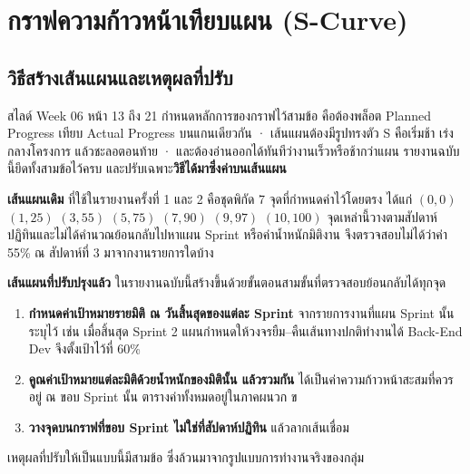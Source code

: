 \clearpage
\section{กราฟความก้าวหน้าเทียบแผน (S-Curve)}
\label{sec:scurve}

\subsection{วิธีสร้างเส้นแผนและเหตุผลที่ปรับ}
\label{sec:curvemethod}

สไลด์ Week 06 หน้า 13 ถึง 21 กำหนดหลักการของกราฟไว้สามข้อ คือต้องพล็อต Planned Progress เทียบ Actual Progress บนแกนเดียวกัน · เส้นแผนต้องมีรูปทรงตัว S คือเริ่มช้า เร่งกลางโครงการ แล้วชะลอตอนท้าย · และต้องอ่านออกได้ทันทีว่างานเร็วหรือช้ากว่าแผน รายงานฉบับนี้ยึดทั้งสามข้อไว้ครบ และปรับเฉพาะ\textbf{วิธีได้มาซึ่งค่าบนเส้นแผน}

\vspace{0.5em}
\noindent\textbf{เส้นแผนเดิม} ที่ใช้ในรายงานครั้งที่ 1 และ 2 คือชุดพิกัด 7 จุดที่กำหนดค่าไว้โดยตรง ได้แก่ $(0,0)$ $(1,25)$ $(3,55)$ $(5,75)$ $(7,90)$ $(9,97)$ $(10,100)$ จุดเหล่านี้วางตามสัปดาห์ปฏิทินและไม่ได้คำนวณย้อนกลับไปหาแผน Sprint หรือค่าน้ำหนักมิติงาน จึงตรวจสอบไม่ได้ว่าค่า 55\% ณ สัปดาห์ที่ 3 มาจากงานรายการใดบ้าง

\vspace{0.5em}
\noindent\textbf{เส้นแผนที่ปรับปรุงแล้ว} ในรายงานฉบับนี้สร้างขึ้นด้วยขั้นตอนสามขั้นที่ตรวจสอบย้อนกลับได้ทุกจุด

\begin{enumerate}
  \item \textbf{กำหนดค่าเป้าหมายรายมิติ ณ วันสิ้นสุดของแต่ละ Sprint} จากรายการงานที่แผน Sprint นั้นระบุไว้ เช่น เมื่อสิ้นสุด Sprint 2 แผนกำหนดให้วงจรยืม–คืนเส้นทางปกติทำงานได้ Back-End Dev จึงตั้งเป้าไว้ที่ 60\%
  \item \textbf{คูณค่าเป้าหมายแต่ละมิติด้วยน้ำหนักของมิตินั้น แล้วรวมกัน} ได้เป็นค่าความก้าวหน้าสะสมที่ควรอยู่ ณ ขอบ Sprint นั้น ตารางค่าทั้งหมดอยู่ในภาคผนวก ข
  \item \textbf{วางจุดบนกราฟที่ขอบ Sprint ไม่ใช่ที่สัปดาห์ปฏิทิน} แล้วลากเส้นเชื่อม
\end{enumerate}

\vspace{0.5em}
\noindent เหตุผลที่ปรับให้เป็นแบบนี้มีสามข้อ ซึ่งล้วนมาจากรูปแบบการทำงานจริงของกลุ่ม

